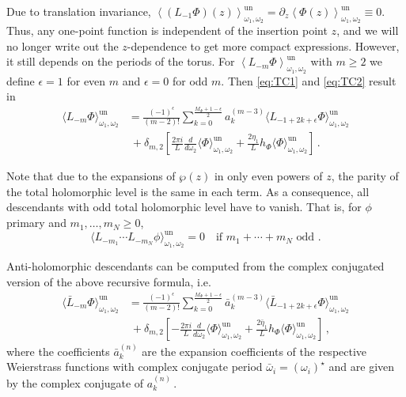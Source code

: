 \documentclass[11pt,a4paper]{article}
\numberwithin{equation}{section}
\begin{document}
Due to translation invariance, $\left\langle(L_{-1}\Phi)(z)\right\rangle^{\mathrm{un}}_{\omega_1,\omega_2} = \partial_z \left\langle\Phi(z)\right\rangle^{\mathrm{un}}_{\omega_1,\omega_2} \equiv0$.
Thus,
any one-point function is independent of the insertion point $z$, 
and we will no longer write out the $z$-dependence to get more compact expressions.
However, it still depends on the periods of the torus.
%
For $\left\langle L_{-m}\Phi\right\rangle^{\mathrm{un}}_{\omega_1,\omega_2}$ with $m\ge 2$ we define $\epsilon=1$ for even $m$ and $\epsilon=0$ for odd $m$. Then
\eqref{eq:TC1} and \eqref{eq:TC2} result in
%
\begin{align}
    \big\langle L_{-m}\Phi\big\rangle^{\mathrm{un}}_{\omega_1,\omega_2} &= \frac{(-1)^\epsilon}{(m-2)!} \sum\limits_{k=0}^{\frac{M_\Phi+1-\epsilon}{2}} a_k^{(m-3)} \big\langle L_{-1+2k+\epsilon}\Phi\big\rangle^{\mathrm{un}}_{\omega_1,\omega_2} \nonumber\\
    & ~ + \delta_{m,2} \left[ \frac{2\pi i}{L} \frac{d}{d\omega_2} \big\langle \Phi\big\rangle^{\mathrm{un}}_{\omega_1,\omega_2} + 
    \frac{2\eta_1}{L} 
    h_{\Phi}\big\langle \Phi\big\rangle^{\mathrm{un}}_{\omega_1,\omega_2} \right]\,.
\end{align}

\noindent 
Note that due to the expansions of $\wp(z)$ in only even powers of $z$, the parity of the total holomorphic level is the same in each term. As a consequence, all descendants with odd total holomorphic level have to vanish. That is, for $\phi$ primary and $m_1,\dots,m_N \ge 0$,
%
\begin{equation}
    \big\langle L_{-m_1} \cdots L_{-m_N} \phi\big\rangle^{\mathrm{un}}_{\omega_1,\omega_2}
    = 0
    \quad \text{if $m_1+\cdots+m_N$ odd .}
\end{equation}

\noindent 
Anti-holomorphic descendants can be computed from the complex conjugated version of the above recursive formula, i.e. 
%
\begin{align}
    \big\langle \bar{L}_{-m}\Phi\big\rangle^{\mathrm{un}}_{\omega_1,\omega_2} &= \frac{(-1)^\epsilon}{(m-2)!} \sum\limits_{k=0}^{\frac{M_\Phi+1-\epsilon}{2}} \bar{a}_k^{(m-3)} \big\langle \bar{L}_{-1+2k+\epsilon}\Phi\big\rangle^{\mathrm{un}}_{\omega_1,\omega_2} \nonumber\\
    & ~ + \delta_{m,2} \left[ -\frac{2\pi i}{L} \frac{d}{d\bar{\omega}_2} \big\langle \Phi\big\rangle^{\mathrm{un}}_{\omega_1,\omega_2} + 
    \frac{2\bar\eta_1}{L} 
    h_{\Phi}\big\langle \Phi\big\rangle^{\mathrm{un}}_{\omega_1,\omega_2} \right]\,,
\end{align}
%
where the coefficients $\bar{a}^{(n)}_{k}$ are the expansion coefficients of the respective Weierstrass functions with complex conjugate period $\bar{\omega}_i = \left(\omega_i\right)^\star$ and are given by the complex conjugate of ${a}^{(n)}_{k}$\,. 
\end{document}
